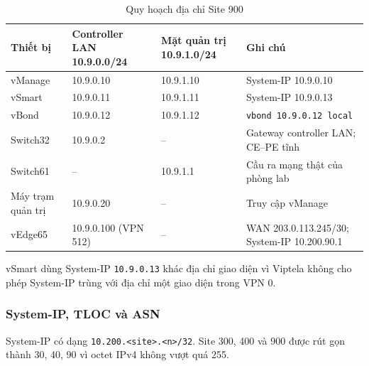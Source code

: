 \begin{table}[H]
    \centering
    \small
    \caption{Quy hoạch địa chỉ Site 900}
    \label{tab:dia_chi_site900}
    \begin{tabularx}{\textwidth}{|P{3.0cm}|P{3.3cm}|P{3.0cm}|X|}
        \hline
        \textbf{Thiết bị} & \textbf{Controller LAN 10.9.0.0/24} & \textbf{Mặt quản trị 10.9.1.0/24} & \textbf{Ghi chú} \\
        \hline
        vManage & 10.9.0.10 & 10.9.1.10 & System-IP 10.9.0.10 \\
        \hline
        vSmart & 10.9.0.11 & 10.9.1.11 & System-IP 10.9.0.13 \\
        \hline
        vBond & 10.9.0.12 & 10.9.1.12 & \texttt{vbond 10.9.0.12 local} \\
        \hline
        Switch32 & 10.9.0.2 & -- & Gateway controller LAN; CE--PE tĩnh \\
        \hline
        Switch61 & -- & 10.9.1.1 & Cầu ra mạng thật của phòng lab \\
        \hline
        Máy trạm quản trị & 10.9.0.20 & -- & Truy cập vManage \\
        \hline
        vEdge65 & 10.9.0.100 (VPN 512) & -- & WAN 203.0.113.245/30; System-IP 10.200.90.1 \\
        \hline
    \end{tabularx}
\end{table}

vSmart dùng System-IP \texttt{10.9.0.13} khác địa chỉ giao diện vì Viptela không cho phép System-IP trùng với địa chỉ một giao diện trong VPN 0.

\subsubsection{System-IP, TLOC và ASN}

System-IP có dạng \texttt{10.200.<site>.<n>/32}. Site 300, 400 và 900 được rút gọn thành 30, 40, 90 vì octet IPv4 không vượt quá 255.

